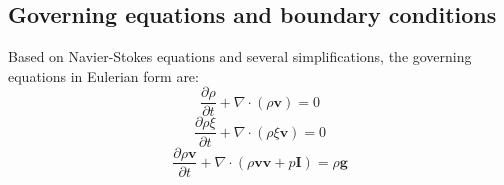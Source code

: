 \documentclass[conference,compsoc]{IEEEtran}
\begin{document}
\subsection{Governing equations\cite{suzuki2005numerical} and boundary conditions}
Based on Navier-Stokes equations and several simplifications, the governing equations in Eulerian form are:
\begin{equation}
\dfrac{\partial \rho}{\partial t} + \nabla \cdot (\rho \textbf{v}) = 0 \label{eq:gov-cs-rho}
\end{equation}
\begin{equation}
\dfrac{\partial \rho \xi}{\partial t} + \nabla \cdot (\rho \xi \textbf{v}) = 0 \label{eq:gov-cs-ks}
\end{equation}
\begin{equation}
\dfrac{\partial \rho \textbf{v}}{\partial t} + \nabla \cdot (\rho \textbf{v} \textbf{v} + p\textbf{I}) = \rho \textbf{g} \label{eq:gov-cs-v}
\end{equation}
\end{document}
